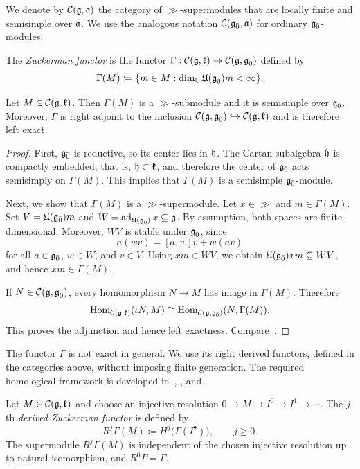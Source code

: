 We denote by $\calC(\gg,\aa)$ the category of $\gg$-supermodules that are locally finite and semisimple over $\aa$. We use the analogous notation $\calC(\even,\aa)$ for ordinary $\even$-modules.

The \emph{Zuckerman functor} is the functor
$\Gamma:\calC(\gg,\kk)\to\calC(\gg,\even)$ defined by
\begin{equation}
\Gamma(M)\coloneqq
\{m\in M:\dim_{\CC}\UE(\even)m<\infty\}.
\end{equation}

\begin{lemma}
Let $M\in\calC(\gg,\kk)$. Then $\Gamma(M)$ is a $\gg$-submodule and it is semisimple over $\even$. Moreover, $\Gamma$ is right adjoint to the inclusion $\calC(\gg,\even)\hookrightarrow\calC(\gg,\kk)$ and is therefore left exact.
\end{lemma}



\begin{proof}
First, $\even$ is reductive, so its center lies in $\hh$. The Cartan subalgebra $\hh$ is compactly embedded, that is, $\hh \subset \kk$, and therefore the center of $\even$ acts semisimply on $\Gamma(M)$. This implies that $\Gamma(M)$ is a semisimple $\even$-module.


Next, we show that $\Gamma(M)$ is a $\gg$-supermodule. Let $x\in\gg$ and $m\in\Gamma(M)$. Set $V=\UE(\even)m$ and $W=\ad_{\UE(\even)}x\subseteq\gg$. By assumption, both spaces are finite-dimensional. Moreover, $WV$ is stable under $\even$, since
\[
a(wv)=[a,w]v+w(av)
\]
for all $a\in\even$, $w\in W$, and $v\in V$. Using $xm\in WV$, we obtain $\UE(\even)xm\subseteq WV$, and hence $xm\in\Gamma(M)$.


If $N\in\calC(\gg,\even)$, every homomorphism $N\to M$ has image in $\Gamma(M)$. Therefore
\[
\Hom_{\calC(\gg,\kk)}(\iota N,M)
\cong
\Hom_{\calC(\gg,\even)}(N,\Gamma(M)).
\]
This proves the adjunction and hence left exactness. Compare~\cite[Proposition~1.2]{milicic1998equivariant}.
\end{proof}

The functor $\Gamma$ is not exact in general. We use its right derived functors, defined in the categories above, without imposing finite generation. The required homological framework is developed in~\cite[Section~1]{milicic1998equivariant}, \cite[Chapter~5]{huang2007dirac}, and~\cite[Section~2]{coulembier2016bott}.

Let $M\in\calC(\gg,\kk)$ and choose an injective resolution
$
0\longrightarrow M
\longrightarrow I^0
\longrightarrow I^1
\longrightarrow\cdots.
$
The $j$-th \emph{derived Zuckerman functor} is defined by
\begin{equation}
R^j\Gamma(M)
\coloneqq
H^j\bigl(\Gamma(I^\bullet)\bigr),
\qquad j\geq0.
\end{equation}
The supermodule $R^{j}\Gamma(M)$
is independent of the chosen injective resolution up to natural isomorphism, and $R^0\Gamma=\Gamma$. 

